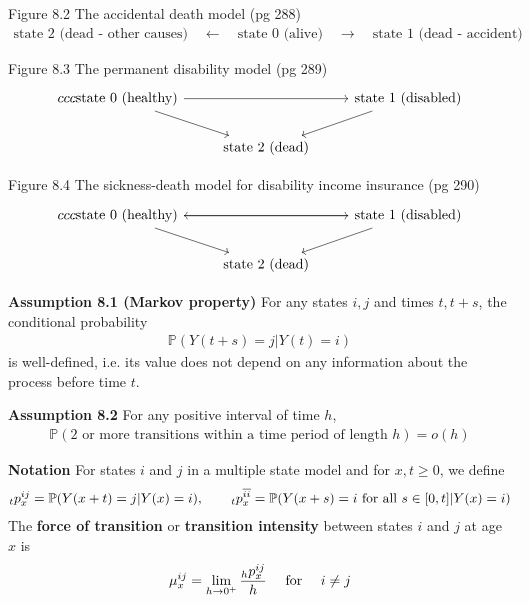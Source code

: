 \documentclass[hidelinks, 12pt]{article}
\theoremstyle{mydefstyle}
\theoremstyle{mythmstyle}
\newcounter{prop}
\begin{document}
Figure 8.2 The accidental death model (pg 288)
\begin{gather*}
\mbox{state 2 (dead - other causes)} \quad \longleftarrow \quad \mbox{state 0 (alive)} \quad \longrightarrow \quad \mbox{state 1 (dead - accident)}
\end{gather*}

Figure 8.3 The permanent disability model (pg 289)
\[\begin{tikzcd}{ccc}
\mbox{state 0 (healthy)} \arrow{rr} \arrow{dr} & & \mbox{state 1 (disabled)} \arrow{dl} \\
& \mbox{state 2 (dead)} &
\end{tikzcd}\]

Figure 8.4 The sickness-death model for disability income insurance (pg 290)
\[\begin{tikzcd}{ccc}
\mbox{state 0 (healthy)} \arrow{rr} \arrow{dr} & & \mbox{state 1 (disabled)} \arrow{ll} \arrow{dl} \\
& \mbox{state 2 (dead)} &
\end{tikzcd}\]

\textbf{Assumption 8.1 (Markov property)} For any states $i, j$ and times $t, t + s$, the conditional probability
\begin{gather*}
\mathbb{P}(Y(t + s) = j \vert Y(t) = i)
\end{gather*}
is well-defined, i.e. its value does not depend on any information about the process before time $t$.

\textbf{Assumption 8.2} For any positive interval of time $h$, 
\begin{gather*}
\mathbb{P}(\mbox{2 or more transitions within a time period of length $h$}) = o(h)
\end{gather*}

\textbf{Notation} For states $i$ and $j$ in a multiple state model and for $x, t \ge 0$, we define
\begin{gather*}
\hspace{0mm}_tp_x^{ij} = \mathbb{P}(Y(x+t) = j \vert Y(x) = i), \qquad
\hspace{0mm}_tp_x^{\overline{ii}} = \mathbb{P}(Y(x+s) = i \mbox{ for all } s\in [0, t] \vert Y(x) = i)
\end{gather*}
The \textbf{force of transition} or \textbf{transition intensity} between states $i$ and $j$ at age $x$ is
\begin{gather*}
\mu_x^{ij} = \lim_{h \to 0^+} \frac{\hspace{0mm}_hp_x^{ij}}{h} \quad\mbox{ for }\quad i \ne j
\end{gather*}
\end{document}
